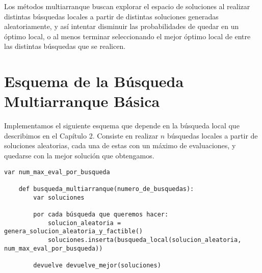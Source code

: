 Los métodos multiarranque buscan explorar el espacio de soluciones al
realizar distintas búsquedas locales a partir de distintas soluciones
generadas aleatoriamente, y así intentar disminuir las probabilidades
de quedar en un óptimo local, o al menos terminar seleccionando el mejor
óptimo local de entre las distintas búsquedas que se realicen.

\section{Esquema de la Búsqueda Multiarranque Básica}

Implementamos el siguiente esquema que depende en la búsqueda local
que describimos en el Capítulo 2. Consiste en realizar $n$ búsquedas
locales a partir de soluciones aleatorias, cada una de estas con un 
máximo de evaluaciones, y quedarse con la mejor solución que obtengamos.

\begin{lstlisting}[mathescape=true,caption={Esquema general de un algoritmo basada en Búsqueda Multiarranque Básica.},captionpos=b]
	var num_max_eval_por_busqueda

	def busqueda_multiarranque(numero_de_busquedas):
		var soluciones

		por cada búsqueda que queremos hacer:
			solucion_aleatoria = genera_solucion_aleatoria_y_factible()
			soluciones.inserta(busqueda_local(solucion_aleatoria, num_max_eval_por_busqueda))

		devuelve devuelve_mejor(soluciones)
\end{lstlisting}